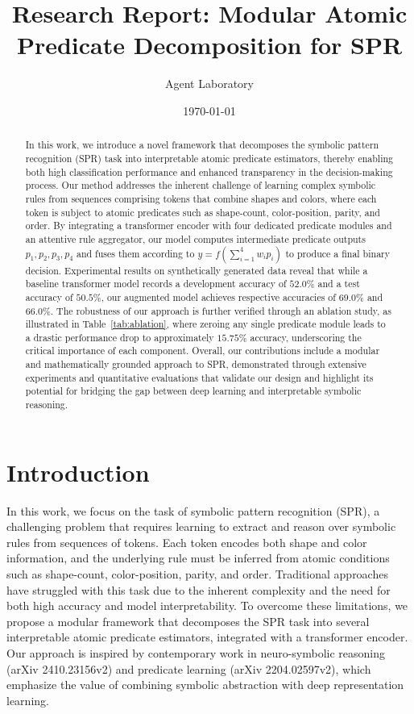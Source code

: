 \documentclass{article}
\title{Research Report: Modular Atomic Predicate Decomposition for SPR}
\author{Agent Laboratory}
\date{\today}
\begin{document}
\maketitle

\begin{abstract}
In this work, we introduce a novel framework that decomposes the symbolic pattern recognition (SPR) task into interpretable atomic predicate estimators, thereby enabling both high classification performance and enhanced transparency in the decision-making process. Our method addresses the inherent challenge of learning complex symbolic rules from sequences comprising tokens that combine shapes and colors, where each token is subject to atomic predicates such as shape-count, color-position, parity, and order. By integrating a transformer encoder with four dedicated predicate modules and an attentive rule aggregator, our model computes intermediate predicate outputs \( p_1, p_2, p_3, p_4 \) and fuses them according to \( y = f\left(\sum_{i=1}^{4} w_i p_i\right) \) to produce a final binary decision. Experimental results on synthetically generated data reveal that while a baseline transformer model records a development accuracy of \(52.0\%\) and a test accuracy of \(50.5\%\), our augmented model achieves respective accuracies of \(69.0\%\) and \(66.0\%\). The robustness of our approach is further verified through an ablation study, as illustrated in Table~\ref{tab:ablation}, where zeroing any single predicate module leads to a drastic performance drop to approximately \(15.75\%\) accuracy, underscoring the critical importance of each component. Overall, our contributions include a modular and mathematically grounded approach to SPR, demonstrated through extensive experiments and quantitative evaluations that validate our design and highlight its potential for bridging the gap between deep learning and interpretable symbolic reasoning.
\end{abstract}

\section{Introduction}
In this work, we focus on the task of symbolic pattern recognition (SPR), a challenging problem that requires learning to extract and reason over symbolic rules from sequences of tokens. Each token encodes both shape and color information, and the underlying rule must be inferred from atomic conditions such as shape-count, color-position, parity, and order. Traditional approaches have struggled with this task due to the inherent complexity and the need for both high accuracy and model interpretability. To overcome these limitations, we propose a modular framework that decomposes the SPR task into several interpretable atomic predicate estimators, integrated with a transformer encoder. Our approach is inspired by contemporary work in neuro-symbolic reasoning (arXiv 2410.23156v2) and predicate learning (arXiv 2204.02597v2), which emphasize the value of combining symbolic abstraction with deep representation learning.
\end{document}

